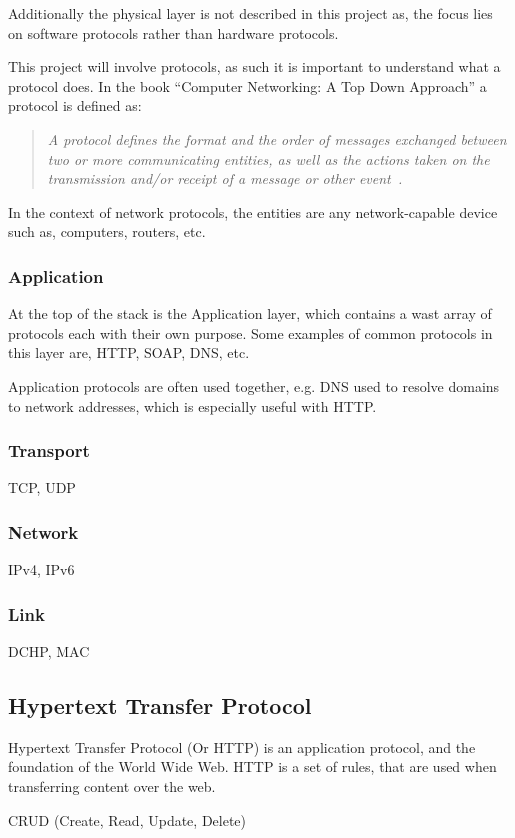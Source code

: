 Additionally the physical layer is not described in this project as, the focus lies on software protocols rather than hardware protocols.

This project will involve protocols, as such it is important to understand what a protocol does. In the book ``Computer Networking: A Top Down Approach'' a protocol is defined as:
\begin{quote}
\textit{A protocol defines the format and the order of messages exchanged between two or more communicating entities, as well as the actions taken on the transmission and/or receipt of a message or other event~\citep[p.9]{computer-networking}.}
\end{quote}
In the context of network protocols, the entities are any network-capable device such as, computers, routers, etc.

\subsubsection{Application}
At the top of the stack is the Application layer, which contains a wast array of protocols each with their own purpose.
Some examples of common protocols in this layer are, HTTP, SOAP, DNS, etc.

Application protocols are often used together, e.g. DNS used to resolve domains to network addresses, which is especially useful with HTTP. 
\subsubsection{Transport}
TCP, UDP

\subsubsection{Network}
IPv4, IPv6

\subsubsection{Link}
DCHP, MAC

\subsection{Hypertext Transfer Protocol}
Hypertext Transfer Protocol (Or HTTP) is an application protocol, and the foundation of the World Wide Web. HTTP is a set of rules, that are used when transferring content over the web. 

CRUD (Create, Read, Update, Delete) 


